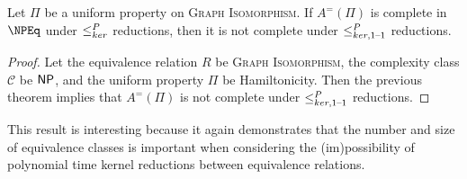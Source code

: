 \begin{corollary}
  Let $\Pi$ be a uniform property on \textsc{Graph Isomorphism}.
  If $A^=(\Pi)$ is complete in $\NPEq$ under $\leq^{P}_{ker}$ reductions, then it is not complete under $\leq^{P}_{ker,1\text{--}1}$ reductions.
\end{corollary}
\begin{proof}
  Let the equivalence relation $R$ be \textsc{Graph Isomorphism}, the complexity class $\mathcal{C}$ be ${\mathsf{NP}}$, and the uniform property $\Pi$ be Hamiltonicity.
  Then the previous theorem implies that $A^=(\Pi)$ is not complete under $\leq^{P}_{ker,1\text{--}1}$ reductions.
\end{proof}

This result is interesting because it again demonstrates that the number and size of equivalence classes is important when considering the (im)possibility of polynomial time kernel reductions between equivalence relations.

